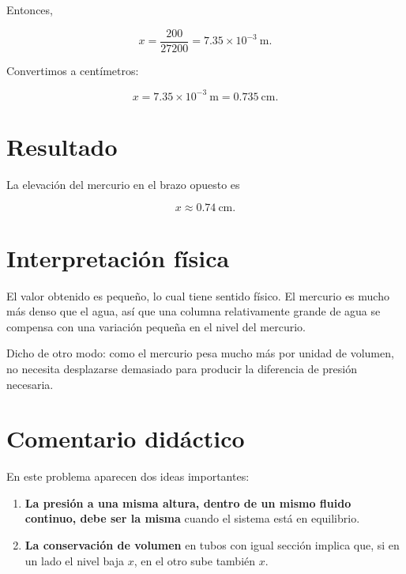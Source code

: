 \documentclass[
  letterpaper,
  DIV=11,
  numbers=noendperiod]{scrreprt}
\providecommand{\tightlist}{%
  \setlength{\itemsep}{0pt}\setlength{\parskip}{0pt}}
\begin{document}
Entonces,

\[
x=\frac{200}{27200}=7.35\times10^{-3}\ \text{m}.
\]

Convertimos a centímetros:

\[
x=7.35\times10^{-3}\ \text{m}=0.735\ \text{cm}.
\]

\section*{Resultado}\label{resultado}


La elevación del mercurio en el brazo opuesto es

\[
\boxed{x\approx 0.74\ \text{cm}}.
\]

\section*{Interpretación física}\label{interpretaciuxf3n-fuxedsica}


El valor obtenido es pequeño, lo cual tiene sentido físico. El mercurio
es mucho más denso que el agua, así que una columna relativamente grande
de agua se compensa con una variación pequeña en el nivel del mercurio.

Dicho de otro modo: como el mercurio pesa mucho más por unidad de
volumen, no necesita desplazarse demasiado para producir la diferencia
de presión necesaria.

\section*{Comentario didáctico}\label{comentario-diduxe1ctico}


En este problema aparecen dos ideas importantes:

\begin{enumerate}
\def\labelenumi{\arabic{enumi}.}
\tightlist
\item
  \textbf{La presión a una misma altura, dentro de un mismo fluido
  continuo, debe ser la misma} cuando el sistema está en equilibrio.
\item
  \textbf{La conservación de volumen} en tubos con igual sección implica
  que, si en un lado el nivel baja \(x\), en el otro sube también \(x\).
\end{enumerate}
\end{document}
